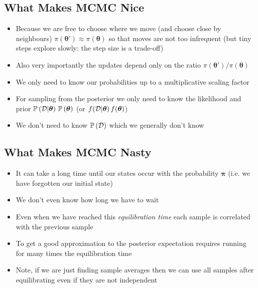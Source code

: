 \begin{slide}
\section{What Makes MCMC Nice}

\begin{PauseHighLight}
  \begin{itemize}
  \item Because we are free to choose where we move (and choose close
    by neighbours) $\pi(\bm{\theta}') \approx \pi(\bm{\theta})$ so that moves are not too
    infrequent\pause{} (but tiny steps explore slowly: the step size
    is a trade-off)\pauseb
  \item Also very importantly the updates depend only on the ratio
    $\pi(\bm{\theta}')/\pi(\bm{\theta})$\pause
  \item We only need to know our probabilities up to a multiplicative
    scaling factor\pause
  \item For sampling from the posterior we only need to know the
    likelihood and prior $\mathbb{P}\left( \mathcal{D}| \bm{\theta} \right)\,\mathbb{P}\left( \bm{\theta} \right)$\pause{}
    (or $f(\mathcal{D}| \bm{\theta})\,f(\bm{\theta})$)\pauseb
  \item We don't need to know $\mathbb{P}\left( \mathcal{D} \right)$ which we generally don't
    know\pause
  \end{itemize}
\end{PauseHighLight}

\end{slide}


\begin{slide}
\section{What Makes MCMC Nasty}

\begin{PauseHighLight}
  \begin{itemize}
  \item It can take a long time until our states occur with the
    probability $\bm{\pi}$ (i.e. we have forgotten our initial
    state)\pause
  \item We don't even know how long we have to wait\pause
  \item Even when we have reached this \textit{equilibration time} each
    sample is correlated with the previous sample\pause
  \item To get a good approximation to the posterior expectation
    requires running for many times the equilibration time\pause
  \item Note, if we are just finding sample averages then we can use all
    samples after equilibrating even if they are not independent\pause
  \end{itemize}
\end{PauseHighLight}

\end{slide}

